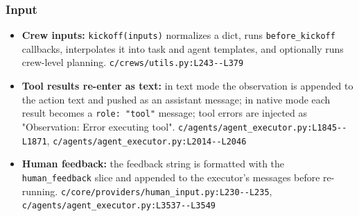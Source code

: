 \subsubsection*{Input}
\begin{itemize}
\item \textbf{Crew inputs:} \texttt{kickoff(\allowbreak{}inputs)} normalizes a dict, runs \texttt{before\_\allowbreak{}kickoff} callbacks, interpolates it into task and agent templates, and optionally runs crew-level planning. \texttt{c/\allowbreak{}crews/\allowbreak{}utils.\allowbreak{}py:\allowbreak{}L243-\allowbreak{}-\allowbreak{}L379}
\item \textbf{Tool results re-enter as text:} in text mode the observation is appended to the action text and pushed as an assistant message; in native mode each result becomes a \texttt{role:\allowbreak{} "tool"} message; tool errors are injected as "Observation: Error executing tool". \texttt{c/\allowbreak{}agents/\allowbreak{}agent\_\allowbreak{}executor.\allowbreak{}py:\allowbreak{}L1845-\allowbreak{}-\allowbreak{}L1871}, \texttt{c/\allowbreak{}agents/\allowbreak{}agent\_\allowbreak{}executor.\allowbreak{}py:\allowbreak{}L2014-\allowbreak{}-\allowbreak{}L2046}
\item \textbf{Human feedback:} the feedback string is formatted with the \texttt{human\_\allowbreak{}feedback} slice and appended to the executor's messages before re-running. \texttt{c/\allowbreak{}core/\allowbreak{}providers/\allowbreak{}human\_\allowbreak{}input.\allowbreak{}py:\allowbreak{}L230-\allowbreak{}-\allowbreak{}L235}, \texttt{c/\allowbreak{}agents/\allowbreak{}agent\_\allowbreak{}executor.\allowbreak{}py:\allowbreak{}L3537-\allowbreak{}-\allowbreak{}L3549}
\end{itemize}

